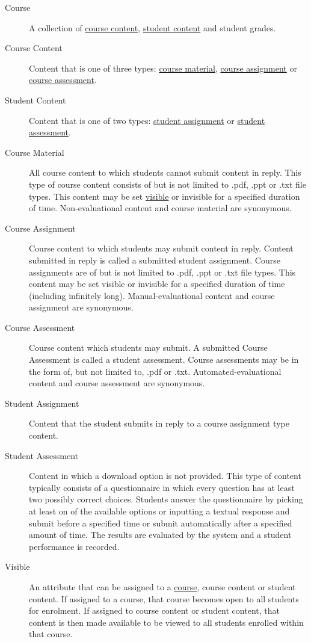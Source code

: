 \documentclass[]{article}
\begin{document}
\begin{description}
  \item [Course] A collection of \underline{course content}, \underline{student
    content} and student grades.

  \item [Course Content] Content that is one of three types: \underline{course
    material}, \underline{course assignment} or \underline{course assessment}.

  \item [Student Content] Content that is one of two types: \underline{student
    assignment} or \underline{student assessment}.

  \item [Course Material] All course content to which students cannot submit
    content in reply. This type of course content consists of but is not
    limited to .pdf, .ppt or .txt file types. This content may be set
    \underline{visible} or invisible for a specified duration of time.
    Non-evaluational content and course material are synonymous.

  \item [Course Assignment] Course content to which students may submit content
    in reply. Content submitted in reply is called a submitted student
    assignment.  Course assignments are of but is not limited to .pdf, .ppt or
    .txt file types. This content may be set visible or invisible for a
    specified duration of time (including infinitely long). Manual-evaluational
    content and course assignment are synonymous.

  \item [Course Assessment] Course content which students may submit. A
    submitted Course Assessment is called a student assessment. Course
    assessments may be in the form of, but not limited to, .pdf or .txt.
    Automated-evaluational content and course assessment are synonymous.

  \item [Student Assignment] Content that the student submits in reply to a
    course assignment type content.

  \item [Student Assessment] Content in which a download option is not
    provided.  This type of content typically consists of a questionnaire in
    which every question has at least two possibly correct choices. Students
    answer the questionnaire by picking at least on of the available options or
    inputting a textual response and submit before a specified time or submit
    automatically after a specified amount of time. The results are evaluated
    by the system and a student performance is recorded.

  \item [Visible] An attribute that can be assigned to a \underline{course},
    course content or student content. If assigned to a course, that course
    becomes open to all students for enrolment. If assigned to course content
    or student content, that content is then made available to be viewed to all
    students enrolled within that course.

\end{description}
\end{document}
